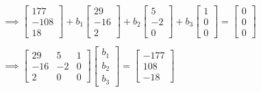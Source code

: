 \documentclass[openany]{book}
\begin{document}
\begin{gather*}
\implies
\begin{bmatrix} 177 \\ -108 \\ 18 \end{bmatrix}
+ b_1
\begin{bmatrix} 29 \\ -16 \\ 2 \end{bmatrix}
+ b_2
\begin{bmatrix} 5 \\ -2 \\ 0 \end{bmatrix} 
+ b_3
\begin{bmatrix} 1 \\ 0 \\ 0 \end{bmatrix} =
\begin{bmatrix} 0 \\ 0 \\ 0 \end{bmatrix} \\ \\
\implies
\begin{bmatrix} 
    29 & 5 & 1 \\ 
    -16 & -2 & 0 \\
    2 & 0 & 0    
\end{bmatrix}
\begin{bmatrix} b_1 \\ b_2 \\ b_3 \end{bmatrix} =
\begin{bmatrix} -177 \\ 108 \\ -18 \end{bmatrix}
\end{gather*}
\end{document}
